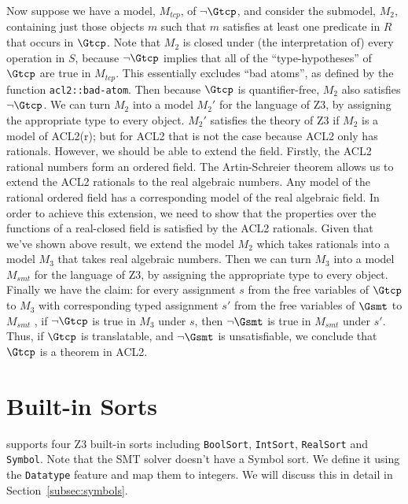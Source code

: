 Now suppose we have a model, $M_{tcp}$, of $\neg \Gtcp$, and consider
the submodel, $M_2$, containing just those objects $m$ such that $m$ satisfies
at least one predicate in $R$ that occurs in $\Gtcp$.
Note that $M_2$ is closed under (the interpretation of) every operation in $S$,
because $\neg \Gtcp$ implies that all of the ``type-hypotheses'' of $\Gtcp$ are
true in $M_{tcp}$.
This essentially excludes ``bad atoms'', as defined by the function
\texttt{acl2::bad-atom}.
Then because $\Gtcp$ is quantifier-free, $M_2$ also satisfies $\neg \Gtcp$.
We can turn $M_2$ into a model $M_2'$ for the language of Z3, by
assigning the appropriate type to every object.
$M_2'$ satisfies the theory of Z3 if $M_2$ is a model of ACL2(r); but for ACL2
that is not the case because ACL2 only has rationals. However, we should be able
to extend the field.
Firstly, the ACL2 rational numbers form an ordered field. The 
Artin-Schreier theorem allows us to extend the ACL2 rationals to the real
algebraic numbers. Any model of the rational ordered field has a corresponding
model of the real algebraic field. In order to achieve this extension, we need
to show that the properties over the functions of a real-closed field is
satisfied by the ACL2 rationals.
Given that we've shown above result, we extend the model $M_2$ which takes
rationals into a model $M_3$ that takes real algebraic numbers. Then we can
turn $M_3$ into a model $M_{smt}$ for the language of Z3, by assigning the
appropriate type to every object.
Finally we have the claim: for every assignment $s$ from the free variables of
$\Gtcp$ to $M_3$ with corresponding typed assignment $s'$ from the free
variables of $\Gsmt$ to $M_{smt}$ , if $\neg \Gtcp$ is true in $M_3$ under $s$,
then $\neg \Gsmt$ is true in $M_{smt}$ under $s'$.
Thus, if $\Gtcp$ is translatable, and $\neg \Gsmt$ is unsatisfiable, we conclude
that $\Gtcp$ is a theorem in ACL2.

\section{Built-in Sorts}\label{sec:soundbuiltin}
\smtlink{} supports four Z3 built-in sorts including \texttt{BoolSort},
\texttt{IntSort}, \texttt{RealSort} and \texttt{Symbol}.
Note that the \acs{SMT} solver doesn't have a Symbol sort.
We define it using the \texttt{Datatype} feature and map them to integers.
We will discuss this in detail in Section~\ref{subsec:symbols}.

